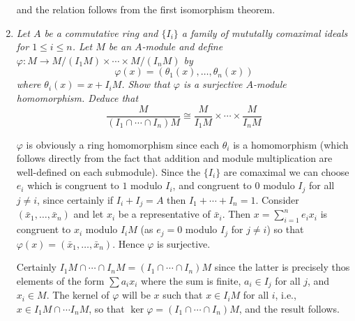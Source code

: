 \documentclass[10pt]{article}
\newcommand{\iso}{\cong}
\begin{document}
\begin{enumerate}
and the relation follows from the first isomorphism theorem.

\item \emph{Let $A$ be a commutative ring and $\{I_i\}$ a family of mututally comaximal ideals for $1 \leq i \leq n$.  Let $M$ be an $A$-module and define $\varphi: M \rightarrow M/(I_1M) \times \cdots \times M/(I_nM)$ by $$\varphi(x) = (\theta_1(x), \ldots, \theta_n(x))$$ where $\theta_i(x) = x + I_iM$.  Show that $\varphi$ is a surjective $A$-module homomorphism.  Deduce that $$\frac{M}{(I_1 \cap \cdots \cap I_n)M} \iso \frac{M}{I_1M} \times \cdots \times \frac{M}{I_nM}$$}

$\varphi$ is obviously a ring homomorphism since each $\theta_i$ is a homomorphism (which follows directly from the fact that addition and module multiplication are well-defined on each submodule).  Since the $\{I_i\}$ are comaximal we can choose $e_i$ which is congruent to $1$ modulo $I_i$, and congruent to $0$ modulo $I_j$ for all $j \neq i$, since certainly if $I_i + I_j = A$ then $I_1 + \cdots + I_n = 1$.  Consider $(\bar{x}_1, \ldots, \bar{x}_n)$ and let $x_i$ be a representative of $\bar{x}_i$.  Then $x = \sum_{i=1}^n e_ix_i$ is congruent to $x_i$ modulo $I_iM$ (as $e_j = 0$ modulo $I_j$ for $j \neq i$) so that $\varphi(x) = (\bar{x}_1, \ldots, \bar{x}_n)$.  Hence $\varphi$ is surjective.

Certainly $I_1M \cap \cdots \cap I_nM = (I_1 \cap \cdots \cap I_n)M$ since the latter is precisely thos elements of the form $\sum a_ix_i$ where the sum is finite, $a_i \in I_j$ for all $j$, and $x_i \in M$.  The kernel of $\varphi$ will be $x$ such that $x \in I_iM$ for all $i$, i.e., $x \in I_1M \cap \cdots I_nM$, so that $\ker \varphi = (I_1 \cap \cdots \cap I_n)M$, and the result follows.


\end{enumerate}
\end{document}
